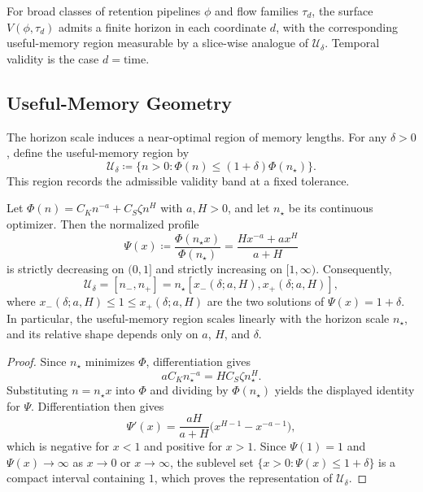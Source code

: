 \begin{conjecture}
For broad classes of retention pipelines $\phi$ and flow families $\tau_d$, the
surface $V(\phi,\tau_d)$ admits a finite horizon in each coordinate $d$, with
the corresponding useful-memory region measurable by a slice-wise analogue of
$\mathcal U_\delta$. Temporal validity is the case $d=\mathrm{time}$.
\end{conjecture}

\subsection{Useful-Memory Geometry}

The horizon scale induces a near-optimal region of memory lengths. For any
$\delta>0$, define the useful-memory region by
\[
  \mathcal U_\delta \coloneqq \{n>0: \Phi(n) \le (1+\delta)\Phi(n_\star)\}.
\]
This region records the admissible validity band at a fixed tolerance.

\begin{proposition}
\label{prop:useful_memory_region}
Let $\Phi(n)=C_K n^{-a}+C_S\zeta n^H$ with $a,H>0$, and let $n_\star$ be its
continuous optimizer. Then the normalized profile
\[
  \Psi(x) \coloneqq \frac{\Phi(n_\star x)}{\Phi(n_\star)}
  = \frac{H x^{-a} + a x^H}{a+H}
\]
is strictly decreasing on $(0,1]$ and strictly increasing on $[1,\infty)$.
Consequently,
\[
  \mathcal U_\delta = [n_-,n_+] = n_\star[x_-(\delta;a,H),x_+(\delta;a,H)],
\]
where $x_-(\delta;a,H)\le 1 \le x_+(\delta;a,H)$ are the two solutions of
$\Psi(x)=1+\delta$. In particular, the useful-memory region scales linearly with
the horizon scale $n_\star$, and its relative shape depends only on $a$, $H$,
and $\delta$.
\end{proposition}

\begin{proof}
Since $n_\star$ minimizes $\Phi$, differentiation gives
\[
  a C_K n_\star^{-a} = H C_S\zeta n_\star^H.
\]
Substituting $n=n_\star x$ into $\Phi$ and dividing by $\Phi(n_\star)$ yields
the displayed identity for $\Psi$. Differentiation then gives
\[
  \Psi'(x)=\frac{aH}{a+H}\bigl(x^{H-1}-x^{-a-1}\bigr),
\]
which is negative for $x<1$ and positive for $x>1$. Since $\Psi(1)=1$ and
$\Psi(x)\to\infty$ as $x\to 0$ or $x\to\infty$, the sublevel set
$\{x>0:\Psi(x)\le 1+\delta\}$ is a compact interval containing $1$, which
proves the representation of $\mathcal U_\delta$.
\end{proof}

